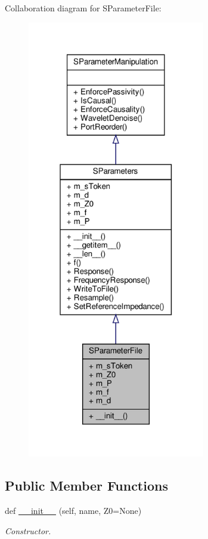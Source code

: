 Collaboration diagram for S\+Parameter\+File\+:\nopagebreak
\begin{figure}[H]
\begin{center}
\leavevmode
\includegraphics[width=220pt]{classSignalIntegrity_1_1SParameters_1_1SParameterFile_1_1SParameterFile__coll__graph}
\end{center}
\end{figure}
\subsection*{Public Member Functions}
\begin{DoxyCompactItemize}
\item 
def \hyperlink{classSignalIntegrity_1_1SParameters_1_1SParameterFile_1_1SParameterFile_ac64ec849ddf7924828e6292d81a6c5d0}{\+\_\+\+\_\+init\+\_\+\+\_\+} (self, name, Z0=None)
\begin{DoxyCompactList}\small\item\em Constructor. \end{DoxyCompactList}\end{DoxyCompactItemize}


